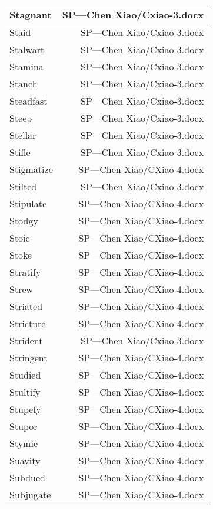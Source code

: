 \documentclass{article}
\begin{document}
\begin{center}
\begin{longtable}{|l|r|}
\hline
Stagnant  &  SP---Chen Xiao/Cxiao-3.docx\\  
\hline
Staid  &  SP---Chen Xiao/Cxiao-3.docx\\  
\hline
Stalwart  &  SP---Chen Xiao/Cxiao-3.docx\\  
\hline
Stamina  &  SP---Chen Xiao/Cxiao-3.docx\\  
\hline
Stanch  &  SP---Chen Xiao/Cxiao-3.docx\\  
\hline
Steadfast  &  SP---Chen Xiao/Cxiao-3.docx\\  
\hline
Steep  &  SP---Chen Xiao/Cxiao-3.docx\\  
\hline
Stellar  &  SP---Chen Xiao/Cxiao-3.docx\\  
\hline
Stifle  &  SP---Chen Xiao/Cxiao-3.docx\\  
\hline
Stigmatize  &  SP---Chen Xiao/CXiao-4.docx\\  
\hline
Stilted  &  SP---Chen Xiao/Cxiao-3.docx\\  
\hline
Stipulate  &  SP---Chen Xiao/CXiao-4.docx\\  
\hline
Stodgy  &  SP---Chen Xiao/CXiao-4.docx\\  
\hline
Stoic  &  SP---Chen Xiao/CXiao-4.docx\\  
\hline
Stoke  &  SP---Chen Xiao/CXiao-4.docx\\  
\hline
Stratify  &  SP---Chen Xiao/CXiao-4.docx\\  
\hline
Strew  &  SP---Chen Xiao/CXiao-4.docx\\  
\hline
Striated  &  SP---Chen Xiao/CXiao-4.docx\\  
\hline
Stricture  &  SP---Chen Xiao/CXiao-4.docx\\  
\hline
Strident  &  SP---Chen Xiao/Cxiao-3.docx\\  
\hline
Stringent  &  SP---Chen Xiao/CXiao-4.docx\\  
\hline
Studied  &  SP---Chen Xiao/CXiao-4.docx\\  
\hline
Stultify  &  SP---Chen Xiao/CXiao-4.docx\\  
\hline
Stupefy  &  SP---Chen Xiao/CXiao-4.docx\\  
\hline
Stupor  &  SP---Chen Xiao/CXiao-4.docx\\  
\hline
Stymie  &  SP---Chen Xiao/CXiao-4.docx\\  
\hline
Suavity  &  SP---Chen Xiao/CXiao-4.docx\\  
\hline
Subdued  &  SP---Chen Xiao/CXiao-4.docx\\  
\hline
Subjugate  &  SP---Chen Xiao/CXiao-4.docx\\  

\end{longtable}
\end{center}
\end{document}
